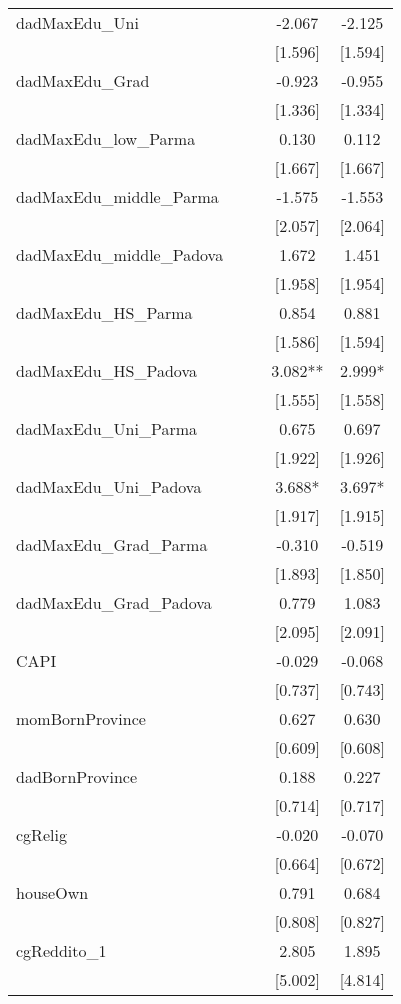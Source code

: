 \documentclass[]{article}
\begin{document}
\begin{tabular}{lcccc}
dadMaxEdu\_Uni &  &  & -2.067 & -2.125 \\
 &  &  & [1.596] & [1.594] \\
dadMaxEdu\_Grad &  &  & -0.923 & -0.955 \\
 &  &  & [1.336] & [1.334] \\
dadMaxEdu\_low\_Parma &  &  & 0.130 & 0.112 \\
 &  &  & [1.667] & [1.667] \\
dadMaxEdu\_middle\_Parma &  &  & -1.575 & -1.553 \\
 &  &  & [2.057] & [2.064] \\
dadMaxEdu\_middle\_Padova &  &  & 1.672 & 1.451 \\
 &  &  & [1.958] & [1.954] \\
dadMaxEdu\_HS\_Parma &  &  & 0.854 & 0.881 \\
 &  &  & [1.586] & [1.594] \\
dadMaxEdu\_HS\_Padova &  &  & 3.082** & 2.999* \\
 &  &  & [1.555] & [1.558] \\
dadMaxEdu\_Uni\_Parma &  &  & 0.675 & 0.697 \\
 &  &  & [1.922] & [1.926] \\
dadMaxEdu\_Uni\_Padova &  &  & 3.688* & 3.697* \\
 &  &  & [1.917] & [1.915] \\
dadMaxEdu\_Grad\_Parma &  &  & -0.310 & -0.519 \\
 &  &  & [1.893] & [1.850] \\
dadMaxEdu\_Grad\_Padova &  &  & 0.779 & 1.083 \\
 &  &  & [2.095] & [2.091] \\
CAPI &  &  & -0.029 & -0.068 \\
 &  &  & [0.737] & [0.743] \\
momBornProvince &  &  & 0.627 & 0.630 \\
 &  &  & [0.609] & [0.608] \\
dadBornProvince &  &  & 0.188 & 0.227 \\
 &  &  & [0.714] & [0.717] \\
cgRelig &  &  & -0.020 & -0.070 \\
 &  &  & [0.664] & [0.672] \\
houseOwn &  &  & 0.791 & 0.684 \\
 &  &  & [0.808] & [0.827] \\
cgReddito\_1 &  &  & 2.805 & 1.895 \\
 &  &  & [5.002] & [4.814] \\

\end{tabular}
\end{document}
